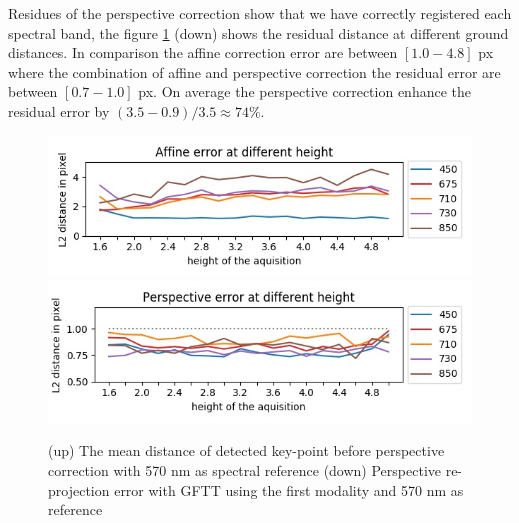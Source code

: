 \documentclass[a4paper,twoside]{article}
\begin{document}
	\par Residues of the perspective correction show that we have correctly registered each spectral band,
	the figure \ref{fig:perspective-error} (down) shows the residual distance at different ground distances.
	In comparison the affine correction error are between $[1.0-4.8]$ px where the combination
	of affine and perspective correction the residual error are between $[0.7-1.0]$ px.
	On average the perspective correction enhance the residual error by $(3.5-0.9)/3.5 \approx 74\%$.
	
	\begin{figure}[h]
		\centering
		\includegraphics[width=\linewidth]{../figures/affine-allignement-rmse.jpg} \\
		\includegraphics[width=\linewidth]{../figures/prespective-allignement-rmse.jpg}
		\caption{
			(up) The mean distance of detected key-point before perspective correction with 570 nm as spectral reference
			(down) Perspective re-projection error with GFTT using the first modality and 570 nm as reference
		}
		\label{fig:perspective-error}
	\end{figure}
	
\end{document}
